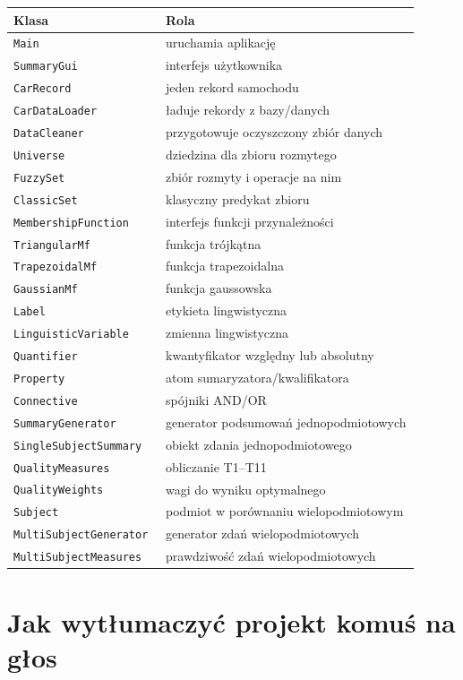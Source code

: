\documentclass[11pt,a4paper]{article}
\newcommand{\code}[1]{\texttt{#1}}
\begin{document}
\begin{longtable}{p{0.30\linewidth}p{0.60\linewidth}}
\toprule
\textbf{Klasa} & \textbf{Rola}\\
\midrule
\endhead
\code{Main} & uruchamia aplikację\\
\code{SummaryGui} & interfejs użytkownika\\
\code{CarRecord} & jeden rekord samochodu\\
\code{CarDataLoader} & ładuje rekordy z bazy/danych\\
\code{DataCleaner} & przygotowuje oczyszczony zbiór danych\\
\code{Universe} & dziedzina dla zbioru rozmytego\\
\code{FuzzySet} & zbiór rozmyty i operacje na nim\\
\code{ClassicSet} & klasyczny predykat zbioru\\
\code{MembershipFunction} & interfejs funkcji przynależności\\
\code{TriangularMf} & funkcja trójkątna\\
\code{TrapezoidalMf} & funkcja trapezoidalna\\
\code{GaussianMf} & funkcja gaussowska\\
\code{Label} & etykieta lingwistyczna\\
\code{LinguisticVariable} & zmienna lingwistyczna\\
\code{Quantifier} & kwantyfikator względny lub absolutny\\
\code{Property} & atom sumaryzatora/kwalifikatora\\
\code{Connective} & spójniki AND/OR\\
\code{SummaryGenerator} & generator podsumowań jednopodmiotowych\\
\code{SingleSubjectSummary} & obiekt zdania jednopodmiotowego\\
\code{QualityMeasures} & obliczanie T1--T11\\
\code{QualityWeights} & wagi do wyniku optymalnego\\
\code{Subject} & podmiot w porównaniu wielopodmiotowym\\
\code{MultiSubjectGenerator} & generator zdań wielopodmiotowych\\
\code{MultiSubjectMeasures} & prawdziwość zdań wielopodmiotowych\\
\bottomrule
\end{longtable}

\section{Jak wytłumaczyć projekt komuś na głos}
\end{document}
